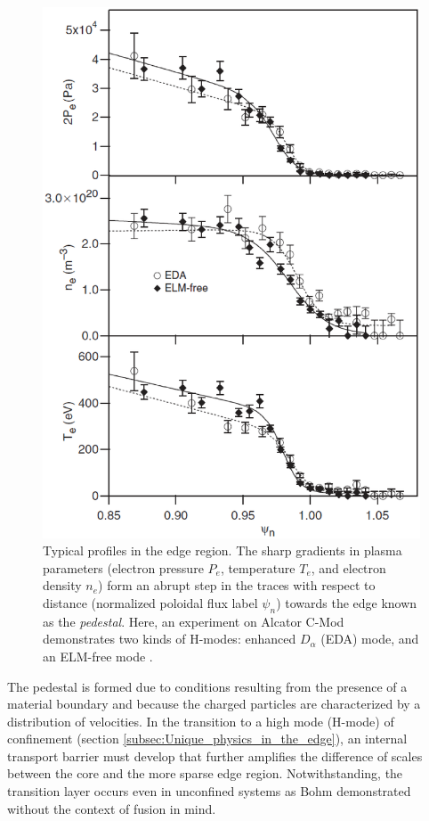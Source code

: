 \documentclass[11pt,titlepage]{report}
\begin{document}
\begin{figure}[h!]
  \centering
    \includegraphics[scale = 0.35]{graphics/pedestal_traces.eps}
  \caption{Typical profiles in the edge region. The sharp gradients in plasma parameters (electron pressure $P_e$, temperature $T_e$, and electron density $n_e$) form an abrupt step in the traces with respect to distance (normalized poloidal flux label $\psi_n$) towards the edge known as the \emph{pedestal}. Here, an experiment on Alcator C-Mod demonstrates two kinds of H-modes: enhanced $D_{\alpha}$ (EDA) mode, and an ELM-free mode \cite{Mossessian02}.}
  \label{fig:pedestal_traces}
\end{figure}

The pedestal is formed due to conditions resulting from the presence of a material boundary and because the charged particles are characterized by a distribution of velocities. In the transition to a high mode (H-mode) of confinement (section \ref{subsec:Unique_physics_in_the_edge}), an internal transport barrier must develop that further amplifies the difference of scales between the core and the more sparse edge region. Notwithstanding, the transition layer occurs even in unconfined systems as Bohm \cite{Bohm} demonstrated without the context of fusion in mind. 
\end{document}

